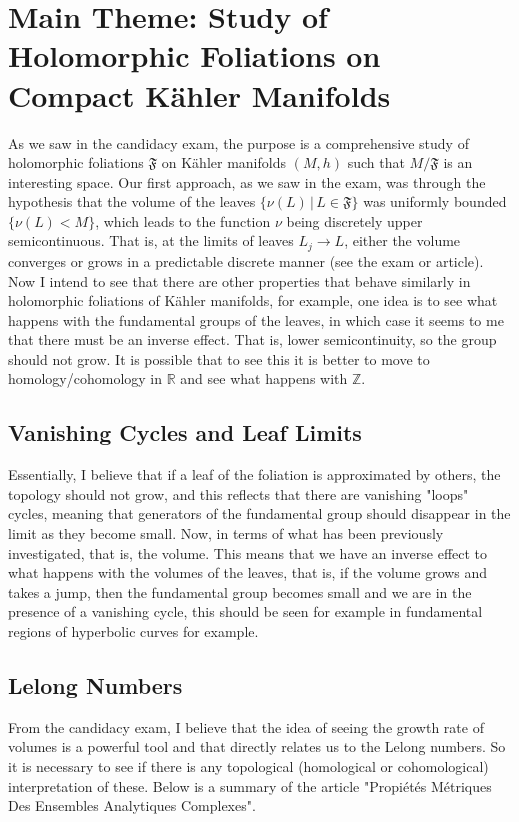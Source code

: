 \documentclass[12pt,twoside,a4paper]{report}
\newcommand{\zah}{\ensuremath{ \mathbb Z }}
\begin{document}
\section{Main Theme: Study of Holomorphic Foliations on Compact Kähler Manifolds}
\label{sec:org8e50cf2}
\noindent As we saw in the candidacy exam, the purpose is a comprehensive study of holomorphic foliations $\mathfrak{F}$ on Kähler manifolds $(M,h)$ such that $M/\mathfrak{F}$ is an interesting space. Our first approach, as we saw in the exam, was through the hypothesis that the volume of the leaves $\{\nu(L) \,|\,L\in\mathfrak{F}\}$ was uniformly bounded $\{\nu(L) < M\}$, which leads to the function $\nu$ being discretely upper semicontinuous. That is, at the limits of leaves $L_j\rightarrow L$, either the volume converges or grows in a predictable discrete manner (see the exam or article). Now I intend to see that there are other properties that behave similarly in holomorphic foliations of Kähler manifolds, for example, one idea is to see what happens with the fundamental groups of the leaves, in which case it seems to me that there must be an inverse effect. That is, lower semicontinuity, so the group should not grow. It is possible that to see this it is better to move to homology/cohomology in $\mathbb{R}$ and see what happens with $\zah$.

\subsection{Vanishing Cycles and Leaf Limits}
\label{sec:orgb5efe58}
\noindent Essentially, I believe that if a leaf of the foliation is approximated by others, the topology should not grow, and this reflects that there are vanishing "loops" cycles, meaning that generators of the fundamental group should disappear in the limit as they become small. Now, in terms of what has been previously investigated, that is, the volume. This means that we have an inverse effect to what happens with the volumes of the leaves, that is, if the volume grows and takes a jump, then the fundamental group becomes small and we are in the presence of a vanishing cycle, this should be seen for example in fundamental regions of hyperbolic curves for example.
\subsection{Lelong Numbers}
\label{sec:orgbdd612b}
\noindent From the candidacy exam, I believe that the idea of seeing the growth rate of volumes is a powerful tool and that directly relates us to the Lelong numbers. So it is necessary to see if there is any topological (homological or cohomological) interpretation of these. Below is a summary of the article "Propiétés Métriques Des Ensembles Analytiques Complexes".
\end{document}
